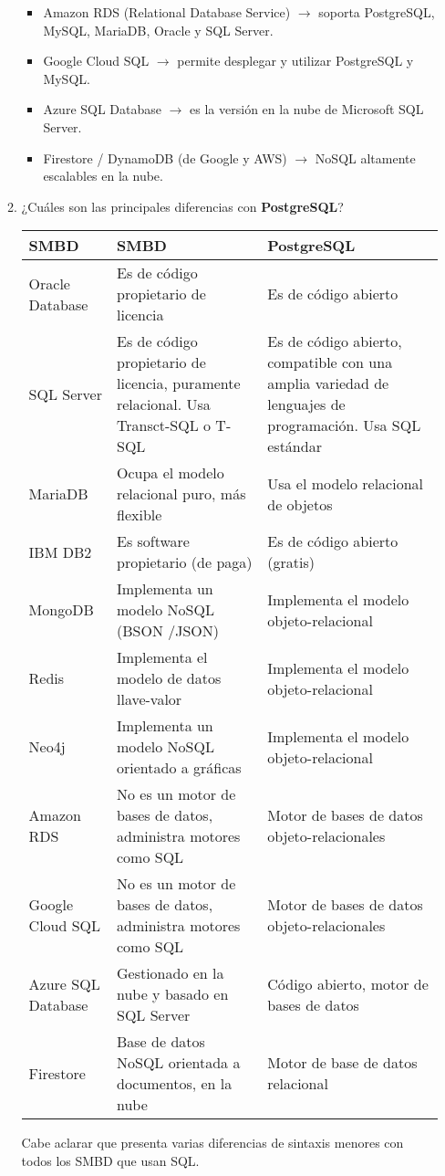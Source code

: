 \documentclass[12pt]{report}
\begin{document}
\begin{enumerate}[label=\roman*.]
\begin{enumerate}[label=\textbf{\arabic*.}, itemsep=2.0em]
\begin{itemize}
    \item Amazon RDS (Relational Database Service) $\rightarrow$ soporta PostgreSQL, MySQL, MariaDB, Oracle y SQL Server.
    \item Google Cloud SQL $\rightarrow$ permite desplegar y utilizar PostgreSQL y MySQL.
    \item Azure SQL Database $\rightarrow$ es la versión en la nube de Microsoft SQL Server.
    \item Firestore / DynamoDB (de Google y AWS) $\rightarrow$ NoSQL altamente escalables en la nube.
\end{itemize}
  \item ¿Cuáles son las principales diferencias con \textbf{PostgreSQL}?
  \begin{table}[H]
\centering
\begin{tabular}{|l|p{6cm}|p{6cm}|}
\hline
\textbf{SMBD} & \textbf{SMBD} & \textbf{PostgreSQL} \\
\hline
Oracle Database & Es de código propietario de licencia & Es de código abierto \\
\hline
SQL Server & Es de código propietario de licencia, puramente relacional. Usa Transct-SQL o T-SQL & Es de código abierto, compatible con una amplia variedad de lenguajes de programación. Usa SQL estándar \\
\hline
MariaDB & Ocupa el modelo relacional puro, más flexible & Usa el modelo relacional de objetos \\
\hline
IBM DB2 & Es software propietario (de paga)& Es de código abierto (gratis) \\
\hline
MongoDB & Implementa un modelo NoSQL (BSON /JSON) & Implementa el modelo objeto-relacional \\
\hline
Redis & Implementa el modelo de datos llave-valor & Implementa el modelo objeto-relacional \\
\hline
Neo4j & Implementa un modelo NoSQL orientado a gráficas & Implementa el modelo objeto-relacional \\
\hline
Amazon RDS & No es un motor de bases de datos, administra motores como SQL & Motor de bases de datos objeto-relacionales \\
\hline
Google Cloud SQL & No es un motor de bases de datos, administra motores como SQL & Motor de bases de datos objeto-relacionales \\
\hline
Azure SQL Database & Gestionado en la nube y basado en SQL Server & Código abierto, motor de bases de datos \\
\hline
Firestore & Base de datos NoSQL orientada a documentos, en la nube & Motor de base de datos relacional \\
\hline
\end{tabular}
\label{tab:postgres-comparativa}
\end{table}
Cabe aclarar que presenta varias diferencias de sintaxis menores con todos los SMBD que usan SQL.


\end{enumerate}
\end{enumerate}
\end{document}
